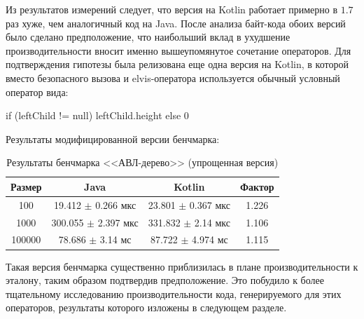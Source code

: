 Из результатов измерений следует, что версия на Kotlin работает примерно в $1.7$ раз хуже, чем
аналогичный код на Java.
После анализа байт-кода обоих версий было сделано предположение, что наибольший вклад в ухудшение
производительности вносит именно вышеупомянутое сочетание операторов.
Для подтверждения гипотезы была релизована еще одна версия на Kotlin, в которой вместо
безопасного вызова и elvis-оператора используется обычный условный оператор вида:
\begin{pyglist}[language=kotlin]
if (leftChild != null) leftChild.height else 0
\end{pyglist}

Результаты модифицированной версии бенчмарка:

\begin{table}[h]
\begin{center}
\begin{tabular}{|c|c|c|c|} \hline
Размер & Java & Kotlin & Фактор \\ \hline
100 & 19.412 $\pm$ 0.266 мкс & 23.801 $\pm$ 0.367 мкс & 1.226\\ \hline
1000 & 300.055 $\pm$ 2.397 мкс & 331.832 $\pm$ 2.14 мкс & 1.106\\ \hline
100000 & 78.686 $\pm$ 3.14 мс & 87.722 $\pm$ 4.974 мс & 1.115\\ \hline
\end{tabular}
\caption{Результаты бенчмарка <<АВЛ-дерево>> (упрощенная версия)}
\end{center}
\end{table}

Такая версия бенчмарка существенно приблизилась в плане производительности к эталону, таким образом
подтвердив предположение.
Это побудило к более тщательному исследованию производительности кода, генерируемого
для этих операторов, результаты которого изложены в следующем разделе.

